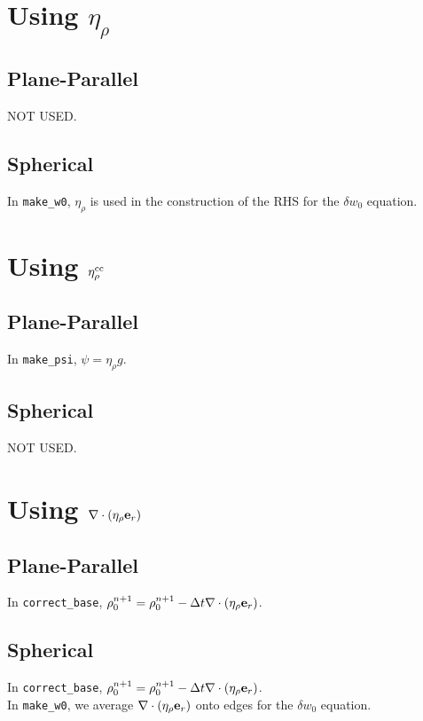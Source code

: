 \documentclass[11pt]{article}
\def\eb         {{\bf e}}
\def\etarho     {\eta_\rho}
\def\etarhocc   {\etarho^{\rm cc}}
\def\divetarho  {\nabla\cdot(\etarho\eb_r)}
\begin{document}
\section{Using $\etarho$}

\subsection{Plane-Parallel}
NOT USED.

\subsection{Spherical}
In {\tt make\_w0}, $\etarho$ is used in the construction of the RHS for the $\delta w_0$ equation.


\section{Using $\etarhocc$}

\subsection{Plane-Parallel}
In {\tt make\_psi}, $\psi = \etarho g$.

\subsection{Spherical}
NOT USED.


\section{Using $\divetarho$}

\subsection{Plane-Parallel}
In {\tt correct\_base}, $\rho_0^{n+1} = \rho_0^{n+1} - \Delta t \divetarho$.

\subsection{Spherical}
In {\tt correct\_base}, $\rho_0^{n+1} = \rho_0^{n+1} - \Delta t \divetarho$. \\
In {\tt make\_w0}, we average $\divetarho$ onto edges for the $\delta w_0$ equation.
\end{document}
